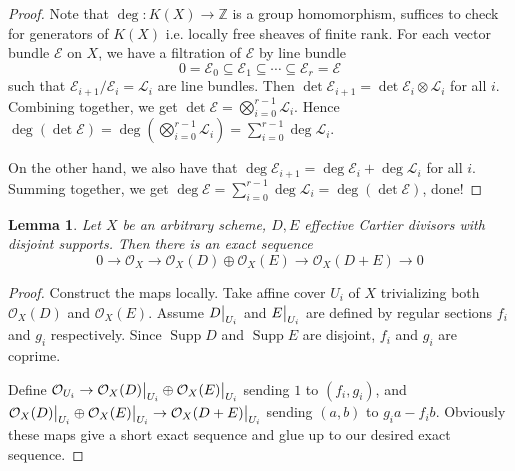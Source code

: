 \documentclass{ctexart}
\newtheorem{lemma}{Lemma}[section]
\newcommand{\support}{\operatorname{Supp}}
\begin{document}
\begin{proof}
    Note that $\deg: K(X) \rightarrow \mathbb{Z}$ is a group homomorphism,
    suffices to check for generators of $K(X)$ i.e. locally free sheaves of finite rank.
    For each vector bundle $\mathcal{E}$ on $X$, we have a filtration of $\mathcal{E}$ by line bundle
    \begin{equation}
        0 = \mathcal{E}_{0} \subseteq \mathcal{E}_{1} \subseteq \cdots \subseteq \mathcal{E}_{r} = \mathcal{E}
    \end{equation}
    such that $\mathcal{E}_{i + 1}/\mathcal{E}_{i} = \mathcal{L}_{i}$ are line bundles.
    Then $\det \mathcal{E}_{i + 1} = \det \mathcal{E}_{i} \otimes \mathcal{L}_{i}$ for all $i$.
    Combining together, we get $\det \mathcal{E} = \bigotimes_{i = 0}^{r - 1} \mathcal{L}_{i}$.
    Hence $\deg (\det \mathcal{E}) = \deg (\bigotimes_{i = 0}^{r - 1} \mathcal{L}_{i}) = \sum_{i = 0}^{r - 1} \deg \mathcal{L}_{i}$.
    \par
    On the other hand, we also have that $\deg \mathcal{E}_{i + 1} = \deg \mathcal{E}_{i} + \deg \mathcal{L}_{i}$ for all $i$.
    Summing together, we get $\deg \mathcal{E} = \sum_{i = 0}^{r - 1} \deg \mathcal{L}_{i} = \deg (\det \mathcal{E})$, done!
\end{proof}
\begin{lemma}
    Let $X$ be an arbitrary scheme, $D, E$ effective Cartier divisors with disjoint supports.
    Then there is an exact sequence
    \begin{equation}
        0 \longrightarrow \mathcal{O}_{X} \longrightarrow \mathcal{O}_{X}(D) \oplus \mathcal{O}_{X}(E) \longrightarrow \mathcal{O}_{X}(D + E) \longrightarrow 0
    \end{equation}
    \label{Lemma 3.7}
\end{lemma}
\begin{proof}
    Construct the maps locally.
    Take affine cover $U_{i}$ of $X$ trivializing both $\mathcal{O}_{X}(D)$ and $\mathcal{O}_{X}(E)$.
    Assume $D\big{|}_{U_{i}}$ and $E\big{|}_{U_{i}}$ are defined by regular sections $f_{i}$ and $g_{i}$ respectively.
    Since $\support D$ and $\support E$ are disjoint, $f_{i}$ and $g_{i}$ are coprime.
    \par
    Define $\mathcal{O}_{U_{i}} \rightarrow \mathcal{O}_{X}(D)\big{|}_{U_{i}} \oplus \mathcal{O}_{X}(E)\big{|}_{U_{i}}$ sending $1$ to $(f_{i}, g_{i})$,
    and $\mathcal{O}_{X}(D)\big{|}_{U_{i}} \oplus \mathcal{O}_{X}(E)\big{|}_{U_{i}} \rightarrow \mathcal{O}_{X}(D + E)\big{|}_{U_{i}}$ sending $(a, b)$ to $g_{i}a - f_{i}b$.
    Obviously these maps give a short exact sequence and glue up to our desired exact sequence.
\end{proof}
\end{document}
